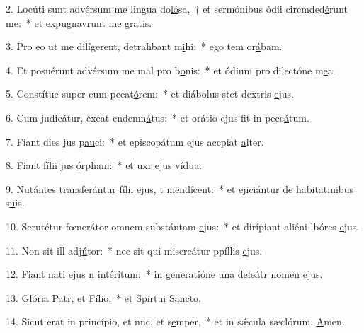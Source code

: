 2. Locúti sunt advérsum me lingua do\uline{ló}sa,~† et sermónibus ódii circmded\uline{é}runt me:~* et expugnavrunt me gr\uline{a}tis.\par 
3. Pro eo ut me dilígerent, detrahbant m\uline{i}hi:~* ego tem or\uline{á}bam.\par 
4. Et posuérunt advérsum me mal pro b\uline{o}nis:~* et ódium pro dilectóne m\uline{e}a.\par 
5. Constítue super eum pccat\uline{ó}rem:~* et diábolus stet  dextris \uline{e}jus.\par 
6. Cum judicátur, éxeat cndemn\uline{á}tus:~* et orátio ejus fit in pecc\uline{á}tum.\par 
7. Fiant dies jus p\uline{au}ci:~* et episcopátum ejus accpiat \uline{a}lter.\par 
8. Fiant fílii jus \uline{ó}rphani:~* et uxr ejus v\uline{í}dua.\par 
9. Nutántes transferántur fílii ejus, t mend\uline{í}cent:~* et ejiciántur de habitatinibus s\uline{u}is.\par 
10. Scrutétur fœnerátor omnem substántam \uline{e}jus:~* et dirípiant aliéni lbóres \uline{e}jus.\par 
11. Non sit ill adj\uline{ú}tor:~* nec sit qui misereátur ppíllis \uline{e}jus.\par 
12. Fiant nati ejus n int\uline{é}ritum:~* in generatióne una deleátr nomen \uline{e}jus.\par 
13. Glória Patr, et F\uline{í}lio,~* et Spirtui S\uline{a}ncto.\par 
14. Sicut erat in princípio, et nnc, et s\uline{e}mper,~* et in sǽcula sæclórum. \uline{A}men.\par 
